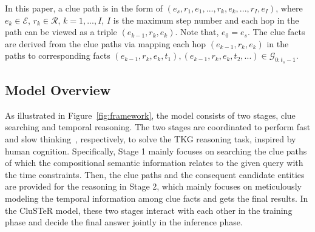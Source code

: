 \documentclass[11pt,a4paper]{article}
\begin{document}
In this paper, a clue path is in the form of $(e_s, r_1, e_1, ..., r_k, e_k,
..., r_I, e_I)$, where $e_{k}\in \mathcal{E}$, $r_{k}\in \mathcal{R}$, $k=1,
..., I$, $I$ is the maximum step number and each hop in the path can be viewed
as a triple $(e_{k-1}, r_k, e_k)$. Note that, $e_0=e_s$. The clue facts are
derived from the clue paths via mapping each hop $(e_{k-1}, r_k, e_k)$ in the
paths to corresponding facts $(e_{k-1}, r_k, e_{k},t_1), (e_{k-1}, r_k,
e_{k},t_2, ...)\in \mathcal{G}_{0:t_s-1}$.



\subsection{Model Overview}
As illustrated in Figure~\ref{fig:framework}, the model consists of two stages,
clue searching and temporal reasoning. The two stages are coordinated to perform
fast and slow thinking~\cite{daniel2017thinking}, respectively, to solve the TKG
reasoning task, inspired by human cognition. Specifically, Stage 1 mainly
focuses on searching the clue paths of which the compositional semantic
information relates to the given query with the time constraints. Then, the clue
paths and the consequent candidate entities are provided for the reasoning in
Stage 2, which mainly focuses on meticulously modeling the temporal information
among clue facts and gets the final results. In the CluSTeR model, these two
stages interact with each other in the training phase and decide the final
answer jointly in the inference phase.




\end{document}
